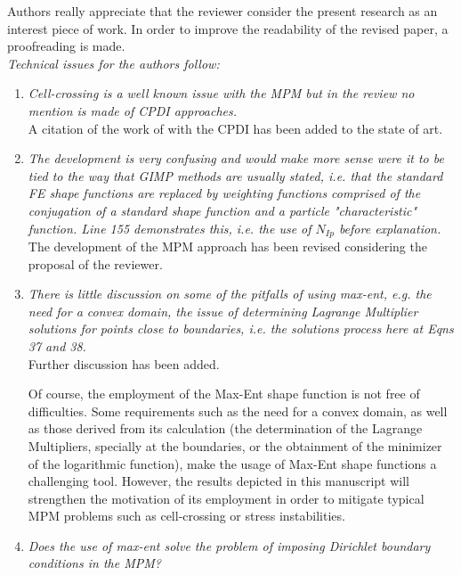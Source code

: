 \documentclass[12pt]{article}
\begin{document}
Authors really appreciate that the reviewer consider the present research as an interest piece of work. In order to improve the readability of the revised paper, a proofreading is made.\\

\textit{Technical issues for the authors follow:}
 \begin{enumerate}
\item \textit{Cell-crossing is a well known issue with the MPM but in the review no mention is made of CPDI approaches.}\\

A citation of the work of \cite{Sadeghirad_2011} with the CPDI has been added to the state of art.

\item \textit{The development is very confusing and would make more sense were it to be tied to 
the way that GIMP methods are usually stated, i.e. that the standard FE shape functions are replaced by weighting functions comprised of the conjugation of a standard shape function and a particle "characteristic" function. Line 155 demonstrates this, i.e. the use of $N_{Ip}$ before explanation.}\\

The development of the MPM approach has been revised considering the proposal of the reviewer. 

\item \textit{There is little discussion on some of the pitfalls of using max-ent, e.g. the need for a convex domain, the issue of determining Lagrange Multiplier solutions for points close to boundaries, i.e. the solutions process here at Eqns 37 and 38.}\\

Further discussion has been added. 

Of course, the employment of the Max-Ent shape function is not free of difficulties. Some requirements such as the need for a convex domain, as well as those derived from its calculation (the determination of the Lagrange Multipliers, specially at the boundaries, or the obtainment of the minimizer of the logarithmic function), make the usage of Max-Ent shape functions a challenging tool. However, the results depicted in this manuscript will strengthen the motivation of its employment in order to mitigate typical MPM problems such as cell-crossing or stress instabilities.

\item \textit{Does the use of max-ent solve the problem of imposing Dirichlet boundary conditions in the MPM?}\\


\end{enumerate}
\end{document}
